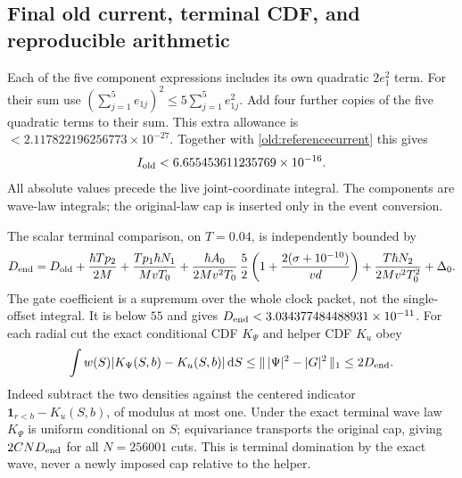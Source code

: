 \documentclass[11pt]{article}
\theoremstyle{definition}\newtheorem{definition}[theorem]{Definition}
\theoremstyle{remark}\newtheorem{remark}[theorem]{Remark}
\newcommand{\one}{\mathbf1}\newcommand{\R}{\mathbb R}\newcommand{\T}{\mathbb T}
\newcommand{\dd}{\,\mathrm d}\newcommand{\Imv}{\operatorname{Im}}\newcommand{\ii}{\mathrm i}
\begin{document}
\subsection{Final old current, terminal CDF, and reproducible arithmetic}
\label{old:current}
Each of the five component expressions includes its own quadratic
$2e_1^2$ term. For their sum use $(\sum_{j=1}^5e_{1j})^2
\leq5\sum_{j=1}^5e_{1j}^2$. Add four further copies of the five
quadratic terms to their sum. This extra allowance is
$<2.117822196256773\times10^{-27}$.
Together with \eqref{old:referencecurrent} this gives
\begin{equation}
 I_{\rm old}<6.655453611235769\times10^{-16}.
 \label{old:Ifinal}
\end{equation}
All absolute values precede the live joint-coordinate integral.
The components are wave-law integrals; the original-law cap is inserted
only in the event conversion.

The scalar terminal comparison, on $T=0.04$, is independently bounded by
\begin{equation}
 D_{\rm end}=D_{\rm old}+\frac{\hbar Tp_2}{2M}
 +\frac{Tp_1\hbar N_1}{MvT_0}
 +\frac{\hbar A_0}{2Mv^2T_0}\,
       \frac52\left(1+\frac{2(\sigma+10^{-10})}{vd}\right)
 +\frac{T\hbar N_2}{2Mv^2T_0^2}+\Delta_0.
 \label{old:terminalD}
\end{equation}
The gate coefficient is a supremum over the whole clock packet, not the
single-offset integral. It is below $55$ and gives
$D_{\rm end}<3.034377484488931\times10^{-11}$.
For each radial cut the exact conditional CDF $K_\Psi$ and helper CDF
$K_u$ obey
\[
 \int w(S)|K_\Psi(S,b)-K_u(S,b)|\dd S
 \leq\|\,|\Psi|^2-|G|^2\,\|_1\leq2D_{\rm end}.
\]
Indeed subtract the two densities against the centered indicator
$\one_{r<b}-K_u(S,b)$, of modulus at most one. Under the exact terminal
wave law $K_\Psi$ is uniform conditional on $S$; equivariance transports
the original cap, giving $2CN D_{\rm end}$ for all $N=256001$ cuts.
This is terminal domination by the exact wave, never a newly imposed
cap relative to the helper.
\end{document}
